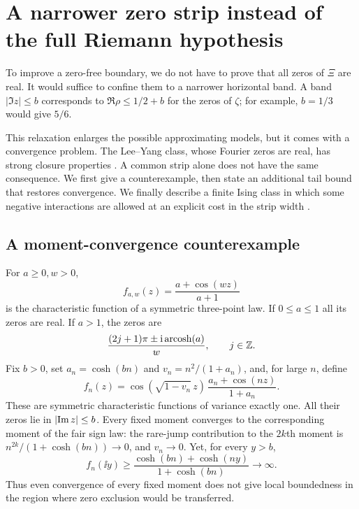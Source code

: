 \section{A narrower zero strip instead of the full Riemann hypothesis}\label{sec:strips}

To improve a zero-free boundary, we do not have to prove that all zeros of $\Xi$ are real. It would suffice to confine them to a narrower horizontal band. A band $|\Im z|\le b$ corresponds to $\Re\rho\le1/2+b$ for the zeros of $\zeta$; for example, $b=1/3$ would give $5/6$.

This relaxation enlarges the possible approximating models, but it comes with a convergence problem. The Lee--Yang class, whose Fourier zeros are real, has strong closure properties \cite{LY52,NW19}. A common strip alone does not have the same consequence. We first give a counterexample, then state an additional tail bound that restores convergence. We finally describe a finite Ising class in which some negative interactions are allowed at an explicit cost in the strip width \cite{R1002,R1003}.

\subsection{A moment-convergence counterexample}
For $a\ge0,w>0$,
\[
 f_{a,w}(z)=\frac{a+\cos(wz)}{a+1}
\]
is the characteristic function of a symmetric three-point law. If $0\le a\le1$ all its zeros are real. If $a>1$, the zeros are
\[
 \frac{(2j+1)\pi\pm\mathrm i\operatorname{arcosh}(a)}{w},\qquad j\in\mathbb Z.
\]
Fix $b>0$, set $a_n=\cosh(bn)$ and $v_n=n^2/(1+a_n)$, and, for large $n$, define
\begin{equation}\label{eq:rare-jump}
 f_n(z)=\cos(\sqrt{1-v_n}\,z)\,
          \frac{a_n+\cos(nz)}{1+a_n}.
\end{equation}
These are symmetric characteristic functions of variance exactly one. All their zeros lie in $\lvert\operatorname{Im} z\rvert\le b$. Every fixed moment converges to the corresponding moment of the fair sign law: the rare-jump contribution to the $2k$th moment is $n^{2k}/(1+\cosh(bn))\to0$, and $v_n\to0$. Yet, for every $y>b$,
\[
 f_n(\ii y)\ge\frac{\cosh(bn)+\cosh(ny)}{1+\cosh(bn)}\longrightarrow\infty.
\]
Thus even convergence of every fixed moment does not give local boundedness in the region where zero exclusion would be transferred.

